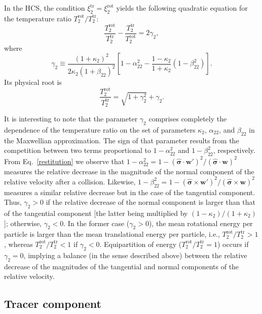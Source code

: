 \documentclass[aps,pre,reprint]{revtex4-1}
\newcommand\beq{\begin{equation}}
\newcommand\eeq{\end{equation}}
\newcommand{\kk}{\widehat{\bm{\sigma}}}
\newcommand{\x}{\times}
\newcommand{\q}{\kappa}
\newcommand{\Tt}{T^{\text{tr}}}
\newcommand{\Tr}{T^{\text{rot}}}
\newcommand{\zt}{\xi^{\text{tr}}}
\newcommand{\zr}{\xi^{\text{rot}}}
\begin{document}
In the HCS, the condition $\zt_{2}=\zr_2$ yields the following quadratic equation for the temperature ratio $\Tr_2/\Tt_2$:
\beq
\frac{\Tr_2}{\Tt_2}-\frac{\Tt_2}{\Tr_2}=2\gamma_2,
\label{79}
\eeq
where
\beq
\label{gamma2}
\gamma_2\equiv \frac{(1+\kappa_2)^2}{2\kappa_2(1+\beta_{22})^2}\left[1-\alpha_{22}^2-\frac{1-\kappa_2}{1+\kappa_2}(1-\beta_{22}^2)\right].
\eeq
Its physical root is
\beq
\label{Tr2}
\frac{\Tr_2}{\Tt_2}=\sqrt{1+\gamma_2^2}+\gamma_2.
\eeq

It is interesting to note that the parameter $\gamma_2$ comprises completely the dependence of the temperature ratio on the set of parameters $\q_2$, $\alpha_{22}$, and $\beta_{22}$ in the Maxwellian approximation. The sign of that parameter results from the competition between two terms proportional to $1-\alpha_{22}^2$ and $1-\beta_{22}^2$, respectively. {}From Eq.\ \eqref{restitution} we observe that $1-\alpha_{22}^2=1-(\kk\cdot \mathbf{w}')^2/(\kk\cdot \mathbf{w})^2$ measures the relative decrease in the magnitude of the normal component of the relative velocity after a collision. Likewise,  $1-\beta_{22}^2=1-(\kk\x \mathbf{w}')^2/(\kk\x \mathbf{w})^2$ measures a similar relative decrease but in the case of the tangential component. Thus, $\gamma_2>0$ if the relative decrease of the normal component is larger than that of the tangential component [the latter being multiplied by $(1-\q_2)/(1+\q_2)$]; otherwise, $\gamma_2<0$. In the former case ($\gamma_2>0$), the mean rotational energy per particle is larger than the mean translational energy per particle, i.e., ${\Tr_2}/{\Tt_2}>1$, whereas  ${\Tr_2}/{\Tt_2}<1$ if $\gamma_2<0$. Equipartition of energy (${\Tr_2}/{\Tt_2}=1$) occurs if $\gamma_2=0$, implying a balance (in the sense described above) between the relative decrease of the magnitudes of the tangential and normal components of the relative velocity.




\subsection{Tracer component}
\label{sec3.B}
\end{document}
